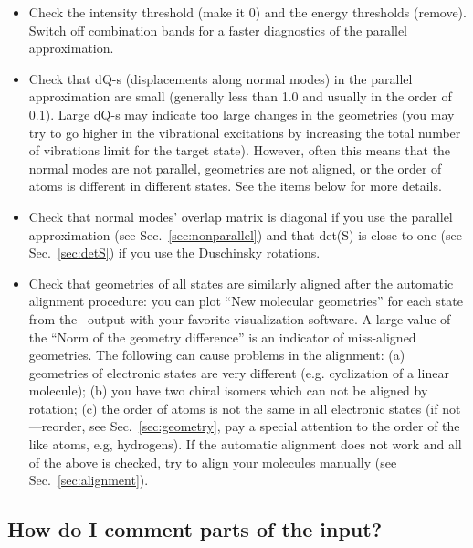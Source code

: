 \documentclass[11pt]{article}
\begin{document}
\begin{itemize}

\item Check the intensity threshold (make it 0) and the energy thresholds (remove). 
Switch off combination bands for a faster diagnostics of the parallel approximation.

\item Check that dQ-s (displacements along normal modes) in the parallel approximation are small
(generally less than 1.0 and usually in the order of 0.1). 
Large dQ-s may indicate too large changes in the geometries 
(you may try to go higher in the vibrational excitations by
increasing the total number of vibrations limit for the target state).
However, often this means that the normal modes are not parallel, geometries are not aligned,
or the order of atoms is different in different states. See the items below for more details.

\item Check that normal modes' overlap matrix is diagonal if you use the parallel approximation (see Sec.~\ref{sec:nonparallel})
and that det(S) is close to one (see Sec.~\ref{sec:detS}) if you use the Duschinsky rotations.

\item Check that geometries of all states are similarly aligned after 
the automatic alignment procedure: you can plot ``New molecular geometries'' for each state
from the \ezFCF\ output with your favorite visualization software. 
A large value of the ``Norm of the geometry difference'' is an indicator of miss-aligned geometries.
The following can cause problems in the alignment:
(a) geometries of electronic states are very different (e.g. cyclization of a linear molecule);
(b) you have two chiral isomers which can not be aligned by rotation;
(c) the order of atoms is not the same in all electronic states
(if not---reorder, see Sec.~\ref{sec:geometry}, 
pay a special attention to the order of the like atoms, e.g, hydrogens).
If the automatic alignment does not work and all of the above is checked, try to align
your molecules manually (see Sec.~\ref{sec:alignment}).
\end{itemize}


\subsection{How do I comment parts of the input?}
\label{sec:comments}
\end{document}

